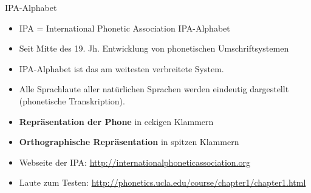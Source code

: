 \begin{frame}{IPA-Alphabet}

	\begin{itemize}
		\item IPA = International Phonetic Association \ras IPA-Alphabet
		\item Seit Mitte des 19. Jh. \ras Entwicklung von phonetischen Umschriftsystemen
		\item IPA-Alphabet ist das am weitesten verbreitete System.
		\item Alle Sprachlaute aller natürlichen Sprachen werden eindeutig dargestellt (phonetische Transkription).
		
		\item \textbf{Repräsentation der Phone} \ras in eckigen Klammern \gqq{\textipa{[ ]}}
		\item \textbf{Orthographische Repräsentation} \ras in spitzen Klammern \gqq{$\langle{} \rangle{}$}
		
		\item {Webseite der IPA}: \url{http://internationalphoneticassociation.org}
		\item {Laute zum Testen}: \url{http://phonetics.ucla.edu/course/chapter1/chapter1.html}
	\end{itemize}
	
\end{frame}


%
%		
%	


